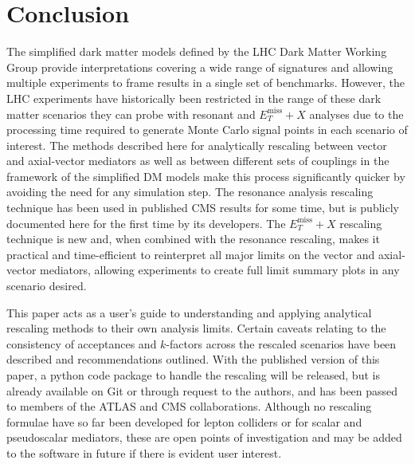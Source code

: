\documentclass[a4paper, 11pt]{article}
\newcommand{\MET}{\ensuremath{E_T^\mathrm{miss}}\xspace}
\newcommand{\metplusx}{\ensuremath{\MET+X}\xspace}
\begin{document}
\section{Conclusion}

The simplified dark matter models defined by the LHC Dark Matter Working Group provide interpretations covering a wide range of signatures and allowing multiple experiments to frame results in a single set of benchmarks.
However, the LHC experiments have historically been restricted in the range of these dark matter scenarios they can probe with resonant and \metplusx analyses due to the processing time required to generate Monte Carlo signal points in each scenario of interest. The methods described here for analytically rescaling between vector and axial-vector mediators as well as between different sets of couplings in the framework of the simplified DM models make this process significantly quicker by avoiding the need for any simulation step.  The resonance analysis rescaling technique has been used in published CMS results for some time, but is publicly documented here for the first time by its developers. The \metplusx rescaling technique is new and, when combined with the resonance rescaling, makes it practical and time-efficient to reinterpret all major limits on the vector and axial-vector mediators, allowing experiments to create full limit summary plots in any scenario desired.

This paper acts as a user's guide to understanding and applying analytical rescaling methods to their own analysis limits. Certain caveats relating to the consistency of acceptances and $k$-factors across the rescaled scenarios have been described and recommendations outlined. With the published version of this paper, a python code package to handle the rescaling will be released, but is already available on Git or through request to the authors, and has been passed to members of the ATLAS and CMS collaborations.
Although no rescaling formulae have so far been developed for lepton colliders or for scalar and pseudoscalar mediators, these are open points of investigation and may be added to the software in future if there is evident user interest.
\end{document}
